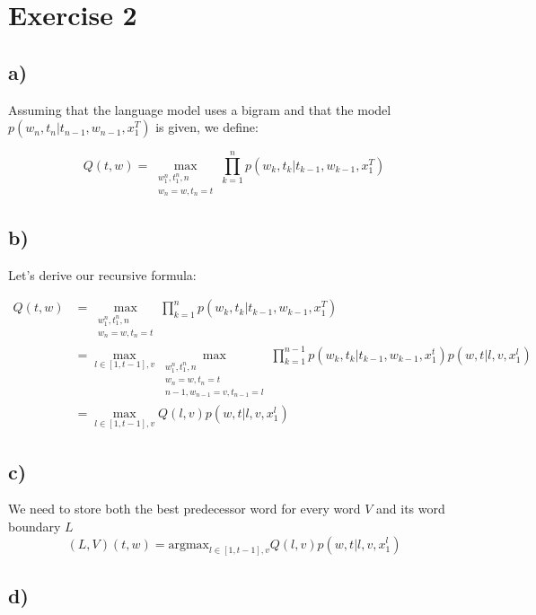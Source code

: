 \section*{Exercise 2} %
\label{sec:section_name}

\subsection*{a)} %
\label{sub:a}

Assuming that the language model uses a bigram and that the model $p(w_n,t_n|t_{n-1}, w_{n-1}, x_1^T)$ is given, 
we define:

\[
	Q(t,w) = \max_{\substack{w_1^n, t_1^n, n \\ w_n = w, t_n = t }} \prod_{k = 1}^n p(w_k,t_k|t_{k-1}, w_{k-1}, x_1^T)
\]

\subsection*{b)}%
\label{sub:b_}

Let's derive our recursive formula: 

\begin{align*}
	Q(t,w) &= \max_{\substack{w_1^n, t_1^n, n \\ w_n = w, t_n = t }} \prod_{k = 1}^n p(w_k,t_k|t_{k-1}, w_{k-1}, x_1^T) \\
		&= \max_{l \in \left[1,t-1\right],v}\max_{\substack{w_1^n, t_1^n, n \\ w_n = w, t_n = t \\ n-1, w_{n-1} = v, t_{n-1} = l }} \prod_{k = 1}^{n-1} p(w_k,t_k|t_{k-1}, w_{k-1}, x_1^t) p(w,t|l,v,x_1^l) \\
		&= \max_{l \in \left[1,t-1\right],v} Q(l,v) p(w,t|l,v,x_1^l)
\end{align*}


\subsection*{c)}%
\label{sub:c_}

We need to store both the best predecessor word for every word $V$ and its
word boundary $L$
\[
	(L,V)(t,w) = \text{argmax}_{l \in \left[1,t-1\right],v} Q(l,v) p(w,t|l,v,x_1^l) 
\]

\subsection*{d)}%
\label{sub:d_}

